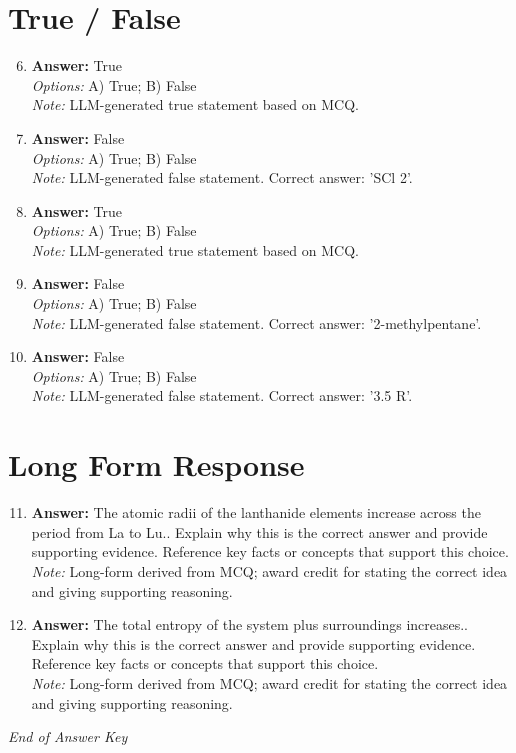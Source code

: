 \documentclass[12pt]{article}
\begin{document}
\section*{True / False}
\begin{enumerate}[label=\arabic*.]
\setcounter{enumi}{5}
\item \textbf{Answer:} True
\\ \textit{Options:} A) True; B) False
\\ \textit{Note:} LLM-generated true statement based on MCQ.
\item \textbf{Answer:} False
\\ \textit{Options:} A) True; B) False
\\ \textit{Note:} LLM-generated false statement. Correct answer: 'SCl 2'.
\item \textbf{Answer:} True
\\ \textit{Options:} A) True; B) False
\\ \textit{Note:} LLM-generated true statement based on MCQ.
\item \textbf{Answer:} False
\\ \textit{Options:} A) True; B) False
\\ \textit{Note:} LLM-generated false statement. Correct answer: '2-methylpentane'.
\item \textbf{Answer:} False
\\ \textit{Options:} A) True; B) False
\\ \textit{Note:} LLM-generated false statement. Correct answer: '3.5 R'.
\end{enumerate}

\section*{Long Form Response}
\begin{enumerate}[label=\arabic*.]
\setcounter{enumi}{10}
\item \textbf{Answer:} The atomic radii of the lanthanide elements increase across the period from La to Lu.. Explain why this is the correct answer and provide supporting evidence. Reference key facts or concepts that support this choice.
\\ \textit{Note:} Long-form derived from MCQ; award credit for stating the correct idea and giving supporting reasoning.
\item \textbf{Answer:} The total entropy of the system plus surroundings increases.. Explain why this is the correct answer and provide supporting evidence. Reference key facts or concepts that support this choice.
\\ \textit{Note:} Long-form derived from MCQ; award credit for stating the correct idea and giving supporting reasoning.
\end{enumerate}

\vfill
\noindent\textit{End of Answer Key}
\end{document}
